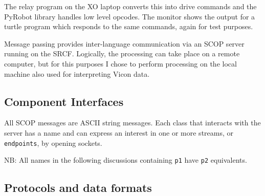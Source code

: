 \documentclass[12pt,a4,notitlepage]{report}
\renewcommand{\_}{\texttt{\symbol{95}}}
\newcommand{\<}{\texttt{\symbol{60}}}
\renewcommand{\>}{\texttt{\symbol{62}}}
\newcommand{\scopendpoint}[1]{\texttt{#1}}
\begin{document}
The relay program on the XO laptop converts this into drive commands and the PyRobot library handles low level opcodes. The monitor shows the output for a turtle program which responds to the same commands, again for test purposes.

Message passing provides inter-language communication via an SCOP server running on the SRCF. Logically, the processing can take place on a remote computer, but for this purposes I chose to perform processing on the local machine also used for interpreting Vicon data.

\subsection{Component Interfaces}

All SCOP messages are ASCII string messages. Each class that interacts with the server has a name and can express an interest in one or more streams, or \scopendpoint{endpoints}, by opening sockets.

NB: All names in the following discussions containing \verb^p1^ have \verb^p2^ equivalents.

\subsection{Protocols and data formats}
\end{document}
